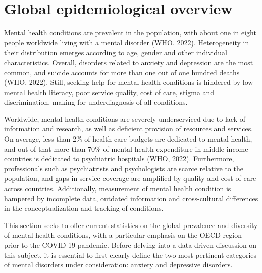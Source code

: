 \section{Global epidemiological overview}
    Mental health conditions are prevalent in the population, with about one in eight people worldwide living with a mental disorder (WHO, 2022). Heterogeneity in their distribution emerges according to age, gender and other individual characteristics. Overall, disorders related to anxiety and depression are the most common, and suicide accounts for more than one out of one hundred deaths (WHO, 2022). 
    Still, seeking help for mental health conditions is hindered by low mental health literacy, poor service quality, cost of care, stigma and discrimination, making for underdiagnosis of all conditions. 

    Worldwide, mental health conditions are severely underserviced due to lack of information and research, as well as deficient provision of resources and services. On average, less than 2\% of health care budgets are dedicated to mental health, and out of that more than 70\% of mental health expenditure in middle-income countries is dedicated to psychiatric hospitals (WHO, 2022). 
    Furthermore, professionals such as psychiatrists and psychologists are scarce relative to the population, and gaps in service coverage are amplified by quality and cost of care across countries. 
    Additionally, measurement of mental health condition is hampered by incomplete data, outdated information and cross-cultural differences in the conceptualization and tracking of conditions. 



    This section seeks to offer current statistics on the global prevalence and diversity of mental health conditions, with a particular emphasis on the OECD region prior to the COVID-19 pandemic. Before delving into a data-driven discussion on this subject, it is essential to first clearly define the two most pertinent categories of mental disorders under consideration: anxiety and depressive disorders. 


